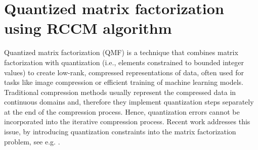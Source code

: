 \documentclass[lettersize,journal]{IEEEtran}
\begin{document}


\section{Quantized matrix factorization using RCCM algorithm}
\noindent Quantized matrix factorization (QMF) is a technique that combines matrix factorization with quantization (i.e., elements constrained to bounded integer values) to create low-rank, compressed representations of data, often used for tasks like image compression or efficient training of machine learning models. Traditional compression methods  usually represent the compressed  data in continuous domains and, therefore they  implement quantization steps separately  at the end of the compression process. Hence,  quantization errors cannot be incorporated into the iterative compression process.  Recent work addresses this issue, by introducing  quantization constraints into the matrix factorization problem, see e.g. \cite{Fre:14, qmf}. 

\medskip
\end{document}
